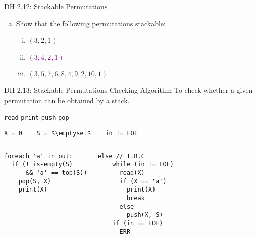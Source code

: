 \begin{frame}{}
  \begin{exampleblock}{DH 2.12: Stackable Permutations}
    \begin{enumerate}[(a)]
      \item Show that the following permutations \emph{} stackable:
	\begin{enumerate}[(i)]
	  \item $(3, 2, 1)$
	  \item \textcolor{purple}{$(3, 4, 2, 1)$}
	  \item $(3, 5, 7, 6, 8, 4, 9, 2, 10, 1)$
	\end{enumerate}
    \end{enumerate}
  \end{exampleblock}

  \pause
  \vspace{0.50cm}
\end{frame}

\begin{frame}[fragile]{}
  \begin{exampleblock}{DH 2.13: Stackable Permutations Checking Algorithm}
    To check whether a given permutation can be obtained by a stack.

    \centerline{\texttt{read} \quad \texttt{print} \quad \texttt{push} \quad \texttt{pop} \quad {}}
  \end{exampleblock}


  \begin{lstlisting}[style = Cstyle]
              X = 0    S = $\emptyset$    in != EOF
  \end{lstlisting}

  \begin{columns}
    \pause
      \begin{lstlisting}[style = Cstyle]
foreach 'a' in out:
  if (! is-empty(S) 
      && 'a' == top(S))
    pop(S, X)
    print(X)
      \end{lstlisting}
    \pause
      \begin{lstlisting}[style = Cstyle]
  else // T.B.C
    while (in != EOF)
      read(X)
      if (X == 'a')
        print(X)
        break
      else
        push(X, S)
    if (in == EOF)
      ERR
      \end{lstlisting}
  \end{columns}
\end{frame}

